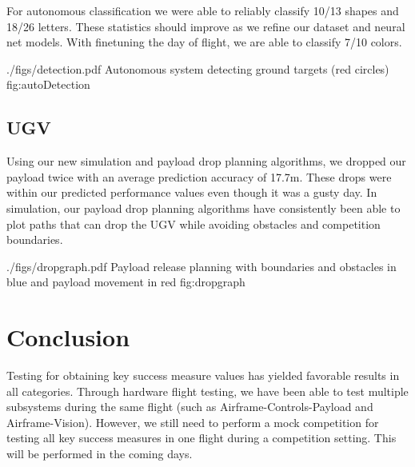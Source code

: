 \documentclass[]{auvsi_doc}
\begin{document}
For autonomous classification we were able to reliably classify 10/13 shapes and 18/26 letters. These statistics should improve as we refine our dataset and neural net models. With finetuning the day of flight, we are able to classify 7/10 colors.

\AUVSIFigure
{./figs/detection.pdf}
{\textwidth}
{Autonomous system detecting ground targets (red circles)}
{fig:autoDetection}

\subsection{UGV}

Using our new simulation and payload drop planning algorithms, we dropped our payload twice with an average
prediction accuracy of 17.7m. These drops were within our predicted performance values even though it was
a gusty day. In simulation, our payload drop planning algorithms have consistently been able to plot paths
that can drop the UGV while avoiding obstacles and competition boundaries.

\AUVSIFigure
{./figs/dropgraph.pdf}
{\textwidth}
{Payload release planning with boundaries and obstacles in blue and payload movement in red}
{fig:dropgraph}

\section{Conclusion}

Testing for obtaining key success measure values has yielded favorable results in all categories. Through hardware flight testing, we have been able to test multiple subsystems during the same flight (such as Airframe-Controls-Payload and Airframe-Vision). However, we still need to perform a mock competition for testing all key success measures in one flight during a competition setting. This will be performed in the coming days.
\end{document}
